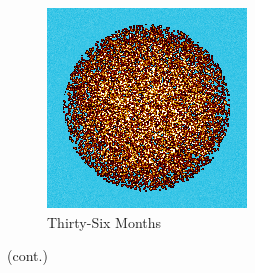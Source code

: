 \begin{figure}[H]
\begin{subfigure}{0.4\textwidth}
  \includegraphics[width=0.95\linewidth]{figures/burn-20-bstep6}
  \caption{Thirty-Six Months}
  \label{fig:bstep6}
\end{subfigure}%
%
\caption[]{(cont.)}
\label{fig:burn-meshes}
\end{figure}